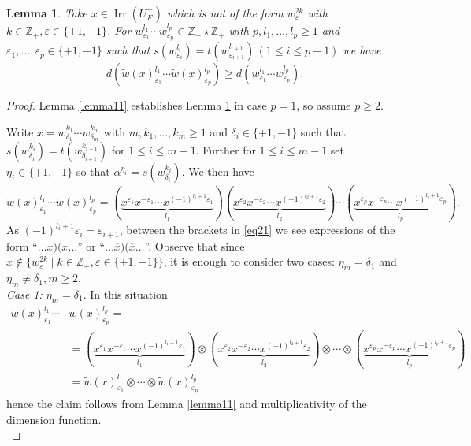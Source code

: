 \documentclass[11 pt, leqno]{amsart}
\newcommand{\eps}{\varepsilon}
\newcommand{\ov}{\overline}
\newcommand{\ZZ}{\mathbb{Z}}
\DeclareMathOperator{\Irr}{Irr}
\newtheorem{lemma}[theorem]{Lemma}
\theoremstyle{definition}
\numberwithin{equation}{section}
\begin{document}
\begin{lemma}\label{lemma12}
Take $x\in \Irr(U_F^+)$ which is not of the form $w^{2k}_{\eps}$ with $k\in\ZZ_+,\eps\in\{+1,-1\}$. For $w^{l_1}_{\eps_1}\cdots w^{l_p}_{\eps_p}\in \ZZ_+\star \ZZ_+$ with $p, l_1,\dotsc,l_p\ge 1$ and $\eps_1,\dotsc,\eps_p\in\{+1,-1\}$ such that $s(w^{l_i}_{\eps_i})=t(w^{l_{i+1}}_{\eps_{i+1}})\,(1\le i \le p-1)$ we have
\[
d(\widetilde{w}(x)^{l_1}_{\eps_1}\cdots 
\widetilde{w}(x)^{l_p}_{\eps_p} ) \ge 
d(w^{l_1}_{\eps_1}\cdots 
w^{l_p}_{\eps_p} ).
\]
\end{lemma}

\begin{proof}
Lemma \ref{lemma11} establishes Lemma \ref{lemma12} in case $p=1$, so assume $p\ge 2$.

Write $x=w^{k_1}_{\delta_1}\cdots w^{k_m}_{\delta_m}$ with $m,k_1,\dotsc,k_m\ge 1$ and $\delta_i\in \{+1,-1\}$ such that $s(w^{k_i}_{\delta_i})=t(w^{k_{i+1}}_{\delta_{i+1}})$ for $1\le i \le m-1$. Further for $1\le i \le m-1$  set $\eta_i\in\{+1, -1\}$ so that  $\alpha^{\eta_i}=s(w^{k_i}_{\delta_{i}})$. We then have
\begin{equation}\label{eq21}
\widetilde{w}(x)^{l_1}_{\eps_1}\cdots
\widetilde{w}(x)^{l_p}_{\eps_p}=
( \underbrace{x^{\eps_1}x^{-\eps_1} \cdots 
x^{(-1)^{l_1+1} \eps_1}}_{l_1})
( \underbrace{x^{\eps_2}x^{-\eps_2} \cdots 
x^{(-1)^{l_2+1} \eps_2}}_{l_2})
\cdots 
( \underbrace{x^{\eps_p}x^{-\eps_p} \cdots 
x^{(-1)^{l_p+1} \eps_p}}_{l_p}).
\end{equation}
As $(-1)^{l_{i}+1}\eps_i = \eps_{i+1}$,  between the brackets in \eqref{eq21} we see expressions of the form  ``$\dotsc x ) ( x \dotsc$'' or ``$\dotsc \ov{x} ) (\ov{x}\dotsc$''. Observe that since $x\notin\{ w^{2k}_\eps\mid k\in\ZZ_+,\eps\in\{+1,-1\}\}$, it is enough to consider two cases: $\eta_m=\delta_1$ and $\eta_m\neq \delta_1,m\ge 2$.\\

\emph{Case 1: $\eta_m=\delta_1$}. In this situation 
\begin{align*}
\widetilde{w}(x)^{l_1}_{\eps_1}\cdots&
\widetilde{w}(x)^{l_p}_{\eps_p} =\\
&=
( \underbrace{x^{\eps_1}x^{-\eps_1} \cdots 
x^{(-1)^{l_1+1} \eps_1}}_{l_1})\otimes
( \underbrace{x^{\eps_2}x^{-\eps_2} \cdots 
x^{(-1)^{l_2+1} \eps_2}}_{l_2})\otimes
\cdots \otimes
( \underbrace{x^{\eps_p}x^{-\eps_p} \cdots 
x^{(-1)^{l_p+1} \eps_p}}_{l_p})\\
&=
\widetilde{w}(x)^{l_1}_{\eps_1}\otimes\cdots\otimes
\widetilde{w}(x)^{l_p}_{\eps_p}
\end{align*}
hence the claim follows from Lemma \ref{lemma11} and multiplicativity of the dimension function.\\


\end{proof}
\end{document}
